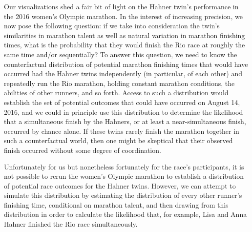 \documentclass[12pt,titlepage]{article}
\begin{document}
Our visualizations shed a fair bit of light on the Hahner twin's
performance in the 2016 women's Olympic marathon.  In the interest of
increasing precision, we now pose the following question: if we take
into consideration the twin's similarities in marathon talent as well
as natural variation in marathon finishing times, what is the
probability that they would finish the Rio race at roughly the same
time and/or sequentially?  To answer this question, we need to know
the counterfactual distribution of potential marathon finishing times
that would have occurred had the Hahner twins independently (in
particular, of each other) and repeatedly run the Rio marathon,
holding constant marathon conditions, the abilities of other runners,
and so forth.  Access to such a distribution would establish the set
of potential outcomes that could have occurred on August 14, 2016, and
we could in principle use this distribution to determine the
likelihood that a simultaneous finish by the Hahners, or at least a
near-simultaneous finish, occurred by chance alone.  If these twins
rarely finish the marathon together in such a counterfactual world,
then one might be skeptical that their observed finish occurred
without some degree of coordination.

Unfortunately for us but nonetheless fortunately for the race's
participants, it is not possible to rerun the women's Olympic marathon
to establish a distribution of potential race outcomes for the Hahner
twins.  However, we can attempt to simulate this distribution by
estimating the distribution of every other runner's finishing time,
conditional on marathon talent, and then drawing from this
distribution in order to calculate the likelihood that, for example,
Lisa and Anna Hahner finished the Rio race simultaneously.
\end{document}
